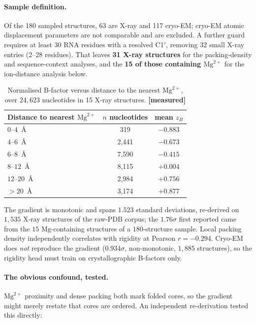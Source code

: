 \documentclass[11pt,a4paper]{article}
\newcommand{\meas}{\textcolor{measured}{\textbf{[measured]}}}
\begin{document}
\paragraph{Sample definition.} Of the 180 sampled structures, 63 are X-ray and
117 cryo-EM; cryo-EM atomic displacement parameters are not comparable and are
excluded. A further guard requires at least 30 RNA residues with a resolved
C1$'$, removing 32 small X-ray entries (2--28 residues). That leaves \textbf{31
X-ray structures} for the packing-density and sequence-context analyses, and the
\textbf{15 of those containing $\mathrm{Mg}^{2+}$} for the ion-distance analysis
below.

\begin{table}[h]
\centering
\caption{Normalised B-factor versus distance to the nearest $\mathrm{Mg}^{2+}$,
over $24{,}623$ nucleotides in 15 X-ray structures. \meas}
\label{tab:mgrigid}
\begin{tabular}{lcc}
\toprule
\textbf{Distance to nearest $\mathrm{Mg}^{2+}$} & \textbf{$n$ nucleotides} & \textbf{mean $z_B$} \\
\midrule
$0$--$4$~\AA{}    & 319   & $\mathbf{-0.883}$ \\
$4$--$6$~\AA{}    & 2{,}441 & $-0.673$ \\
$6$--$8$~\AA{}    & 7{,}590 & $-0.415$ \\
$8$--$12$~\AA{}   & 8{,}115 & $+0.004$ \\
$12$--$20$~\AA{}  & 2{,}984 & $+0.756$ \\
$> 20$~\AA{}      & 3{,}174 & $\mathbf{+0.877}$ \\
\bottomrule
\end{tabular}
\end{table}

The gradient is monotonic and spans $1.523$ standard deviations, re-derived on
$1{,}535$ X-ray structures of the raw-PDB corpus; the $1.76\sigma$ first reported
came from the $15$ $\mathrm{Mg}$-containing structures of a $180$-structure
sample. Local packing density independently correlates with rigidity at Pearson
$r = -0.294$. Cryo-EM does \emph{not} reproduce the gradient ($0.934\sigma$,
non-monotonic, $1{,}885$ structures), so the rigidity head must train on
crystallographic B-factors only.

\paragraph{The obvious confound, tested.} $\mathrm{Mg}^{2+}$ proximity and dense
packing both mark folded cores, so the gradient might merely restate that cores
are ordered. An independent re-derivation tested this directly:
\end{document}
